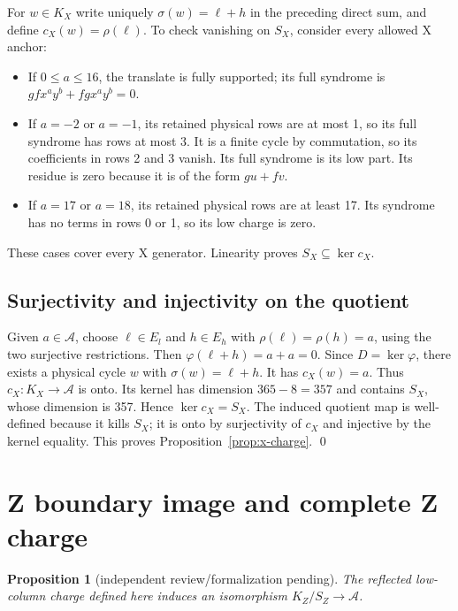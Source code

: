 \documentclass{article}
\newtheorem{proposition}{Proposition}
\begin{document}
For \(w \in K_X\) write uniquely \(\sigma(w) = \ell + h\) in the preceding direct sum, and
define \(c_X(w) = \rho(\ell)\). To check vanishing on \(S_X\), consider every allowed X
anchor:
\begin{itemize}
  \item If \(0 \le a \le 16\), the translate is fully supported; its full syndrome is
    \(gfx^a y^b + fgx^a y^b = 0\).
  \item If \(a = -2\) or \(a = -1\), its retained physical rows are at most 1, so its full
    syndrome has rows at most 3. It is a finite cycle by commutation, so its coefficients in
    rows 2 and 3 vanish. Its full syndrome is its low part. Its residue is zero because it
    is of the form \(gu + fv\).
  \item If \(a = 17\) or \(a = 18\), its retained physical rows are at least 17. Its
    syndrome has no terms in rows 0 or 1, so its low charge is zero.
\end{itemize}
These cases cover every X generator. Linearity proves \(S_X \subseteq \ker c_X\).

\subsection{Surjectivity and injectivity on the quotient}\label{sec:x-quotient}

Given \(a \in \mathcal{A}\), choose \(\ell \in E_l\) and \(h \in E_h\) with
\(\rho(\ell) = \rho(h) = a\), using the two surjective restrictions. Then
\(\varphi(\ell + h) = a + a = 0\). Since \(D = \ker \varphi\), there exists a physical cycle
\(w\) with \(\sigma(w) = \ell + h\). It has \(c_X(w) = a\). Thus
\(c_X \colon K_X \to \mathcal{A}\) is onto. Its kernel has dimension \(365 - 8 = 357\) and
contains \(S_X\), whose dimension is 357. Hence \(\ker c_X = S_X\). The induced quotient map
is well-defined because it kills \(S_X\); it is onto by surjectivity of \(c_X\) and
injective by the kernel equality. This proves Proposition~\ref{prop:x-charge}. \qed

\section{Z boundary image and complete Z charge}\label{sec:z-charge}

\begin{proposition}[independent review\slash formalization pending]\label{prop:z-charge}
  The reflected low-column charge defined here induces an isomorphism
  \(K_Z/S_Z \to \mathcal{A}\).
\end{proposition}
\end{document}
